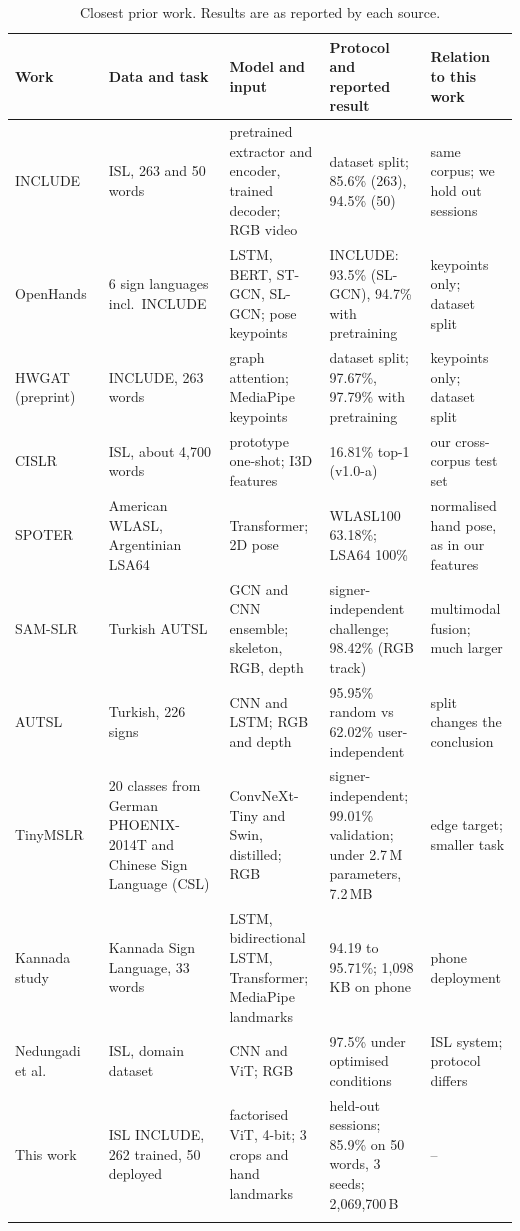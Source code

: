 \documentclass[pdflatex,sn-mathphys-num,onecolumn]{sn-jnl}
\theoremstyle{thmstyleone}%
\begin{document}
\begin{table}[!htbp]
\caption{Closest prior work. Results are as reported by each source.}\label{tab:lit}
\scriptsize
\setlength{\tabcolsep}{2.5pt}
\begin{tabularx}{\textwidth}{@{}L{2.5cm}L{3.3cm}L{3.6cm}YL{3.3cm}@{}}
\toprule
Work & Data and task & Model and input & Protocol and reported result & Relation to this work \\
\midrule
INCLUDE~\cite{sridhar2020include} & ISL, 263 and 50 words & pretrained extractor and encoder, trained decoder; RGB video & dataset split; 85.6\% (263), 94.5\% (50) & same corpus; we hold out sessions \\\addlinespace[2.5pt]
OpenHands~\cite{selvaraj2022openhands} & 6 sign languages incl.\ INCLUDE & LSTM, BERT, ST-GCN, SL-GCN; pose keypoints & INCLUDE: 93.5\% (SL-GCN), 94.7\% with pretraining & keypoints only; dataset split \\\addlinespace[2.5pt]
HWGAT~\cite{patra2024hwgat} (preprint) & INCLUDE, 263 words & graph attention; MediaPipe keypoints & dataset split; 97.67\%, 97.79\% with pretraining & keypoints only; dataset split \\\addlinespace[2.5pt]
CISLR~\cite{joshi2022cislr} & ISL, about 4,700 words & prototype one-shot; I3D features & 16.81\% top-1 (v1.0-a) & our cross-corpus test set \\\addlinespace[2.5pt]
SPOTER~\cite{bohacek2022spoter} & American WLASL, Argentinian LSA64 & Transformer; 2D pose & WLASL100 63.18\%; LSA64 100\% & normalised hand pose, as in our features \\\addlinespace[2.5pt]
SAM-SLR~\cite{jiang2021samslr} & Turkish AUTSL & GCN and CNN ensemble; skeleton, RGB, depth & signer-independent challenge; 98.42\% (RGB track) & multimodal fusion; much larger \\\addlinespace[2.5pt]
AUTSL~\cite{sincan2020autsl} & Turkish, 226 signs & CNN and LSTM; RGB and depth & 95.95\% random vs 62.02\% user-independent & split changes the conclusion \\\addlinespace[2.5pt]
Tiny\-MSLR~\cite{lamaakal2026tinymslr} & 20 classes from German PHOENIX-2014T and Chinese Sign Language (CSL) & ConvNeXt-Tiny and Swin, distilled; RGB & signer-independent; 99.01\% validation; under 2.7\,M parameters, 7.2\,MB & edge target; smaller task \\\addlinespace[2.5pt]
Kannada study~\cite{venkatappa2026kannada} & Kannada Sign Language, 33 words & LSTM, bidirectional LSTM, Transformer; MediaPipe landmarks & 94.19 to 95.71\%; 1,098\,KB on phone & phone deployment \\\addlinespace[2.5pt]
Nedungadi et al.~\cite{nedungadi2025vit} & ISL, domain dataset & CNN and ViT; RGB & 97.5\% under optimised conditions & ISL system; protocol differs \\
\midrule
This work & ISL INCLUDE, 262 trained, 50 deployed & factorised ViT, 4-bit; 3 crops and hand landmarks & held-out sessions; 85.9\% on 50 words, 3 seeds; 2,069,700\,B & -- \\
\botrule
\end{tabularx}
\end{table}
\end{document}
